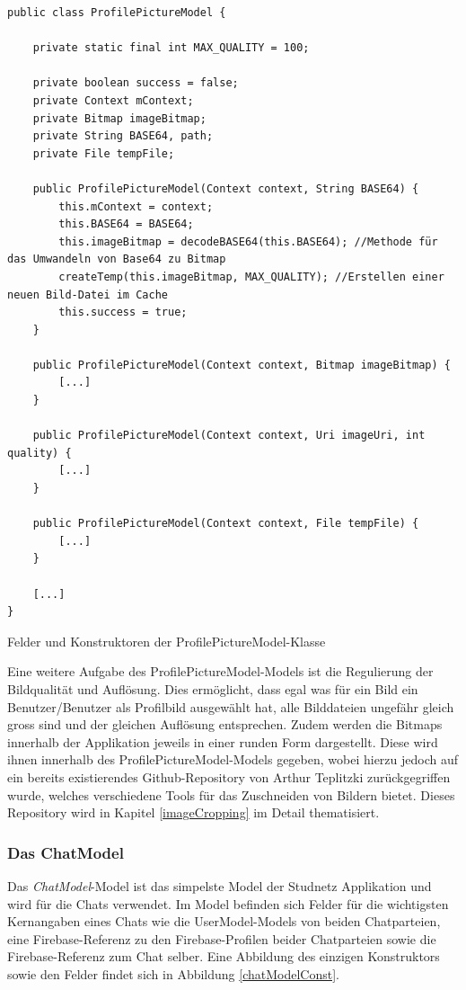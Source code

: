 \documentclass[../main.tex]{subfiles}
\begin{document}
\begin{code}
	\begin{center}
		\begin{verbatim}
public class ProfilePictureModel {

	private static final int MAX_QUALITY = 100;

	private boolean success = false;
	private Context mContext;
	private Bitmap imageBitmap;
	private String BASE64, path;
	private File tempFile;

	public ProfilePictureModel(Context context, String BASE64) {
		this.mContext = context;
		this.BASE64 = BASE64;
		this.imageBitmap = decodeBASE64(this.BASE64); //Methode für das Umwandeln von Base64 zu Bitmap
		createTemp(this.imageBitmap, MAX_QUALITY); //Erstellen einer neuen Bild-Datei im Cache
		this.success = true;
	}

	public ProfilePictureModel(Context context, Bitmap imageBitmap) {
		[...]
	}

	public ProfilePictureModel(Context context, Uri imageUri, int quality) {
		[...]
	}

	public ProfilePictureModel(Context context, File tempFile) {
		[...]
	}
	
	[...]
}
		\end{verbatim}
		\caption{Felder und Konstruktoren der ProfilePictureModel-Klasse}
		\label{profilePictureModelConst}
	\end{center}
	
\end{code}

	Eine weitere Aufgabe des ProfilePictureModel-Models ist die Regulierung der Bildqualität und Auflösung. Dies ermöglicht, dass egal was für ein Bild ein Benutzer/Benutzer als Profilbild ausgewählt hat, alle Bilddateien ungefähr gleich gross sind und der gleichen Auflösung entsprechen. Zudem werden die Bitmaps innerhalb der Applikation jeweils in einer runden Form dargestellt. Diese wird ihnen innerhalb des ProfilePictureModel-Models gegeben, wobei hierzu jedoch auf ein bereits existierendes Github-Repository von Arthur Teplitzki \cite{Cropper} zurückgegriffen wurde, welches verschiedene Tools für das Zuschneiden von Bildern bietet. Dieses Repository wird in Kapitel \ref{imageCropping} im Detail thematisiert.
	
	\subsubsection{Das ChatModel}
	Das \emph{ChatModel}-Model ist das simpelste Model der Studnetz Applikation und wird für die Chats verwendet. Im Model befinden sich Felder für die wichtigsten Kernangaben eines Chats wie die UserModel-Models von beiden Chatparteien, eine Firebase-Referenz zu den Firebase-Profilen beider Chatparteien sowie die Firebase-Referenz zum Chat selber. Eine Abbildung des einzigen Konstruktors sowie den Felder findet sich in Abbildung \ref{chatModelConst}.
	
\end{document}
